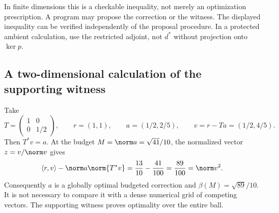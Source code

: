 In finite dimensions this is a checkable inequality, not merely an optimization prescription. A program may propose the correction or the witness. The displayed inequality can be verified independently of the proposal procedure. In a protected ambient calculation, use the restricted adjoint, not $d^*$ without projection onto $\ker p$.

\subsection{A two-dimensional calculation of the supporting witness}
Take
\[
 T=\begin{pmatrix}1&0\\0&1/2\end{pmatrix},\qquad r=(1,1),\qquad
 a=(1/2,2/5),\qquad v=r-Ta=(1/2,4/5).
\]
Then $T^*v=a$. At the budget $M=\norm a=\sqrt{41}/10$, the normalized vector $z=v/\norm v$ gives
\[
 \langle r,v\rangle-\norm a\norm{T^*v}
 =\frac{13}{10}-\frac{41}{100}=\frac{89}{100}=\norm v^2.
\]
Consequently $a$ is a globally optimal budgeted correction and $\beta(M)=\sqrt{89}/10$. It is not necessary to compare it with a dense numerical grid of competing vectors. The supporting witness proves optimality over the entire ball.


